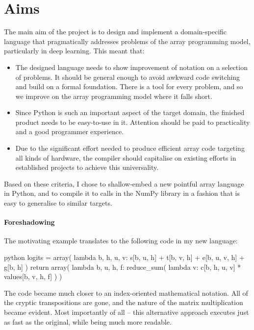 \section{Aims}

The main aim of the project is to design and implement a domain-specific language that pragmatically addresses problems of the array programming model, particularly in deep learning. This meant that:
\begin{itemize}
    \item The designed language needs to show improvement of notation on a selection of problems. It should be general enough to avoid awkward code switching and build on a formal foundation. There is a tool for every problem, and so we improve on the array programming model where it falls short. 
    \item Since Python is such an important aspect of the target domain, the finished product needs to be easy-to-use in it. Attention should be paid to practicality and a good programmer experience.
    \item Due to the significant effort needed to produce efficient array code targeting all kinds of hardware, the compiler should capitalise on existing efforts in established projects to achieve this universality.
\end{itemize}
Based on these criteria, I chose to shallow-embed a new pointful array language in Python, and to compile it to calls in the NumPy library in a fashion that is easy to generalise to similar targets. 

\paragraph{Foreshadowing} The motivating example translates to the following code in my new language:
\begin{center}
\begin{cminted}{python}
logits = array(
    lambda b, h, u, v: s[b, u, h] + t[b, v, h] + e[b, u, v, h] + g[b, h]
)
return array(
    lambda b, u, h, f: reduce_sum(
        lambda v: c[b, h, u, v] * values[b, v, h, f]
    )
)
\end{cminted}
\end{center}
The code became much closer to an index-oriented mathematical notation. All of the cryptic transpositions are gone, and the nature of the matrix multiplication became evident. Most importantly of all -- this alternative approach executes just as fast as the original, while being much more readable.
